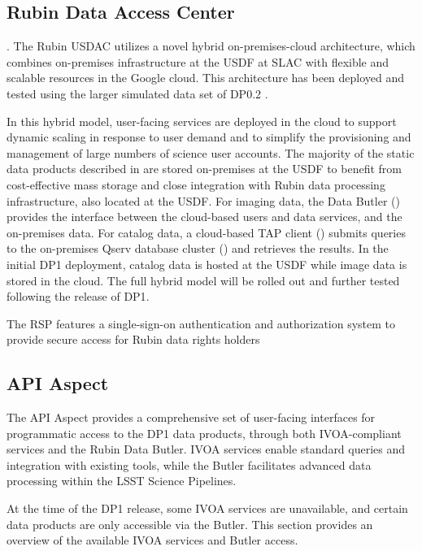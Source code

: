 \subsection{Rubin Data Access Center
\label{ssec:usdac}}.
The Rubin USDAC utilizes a novel hybrid on-premises-cloud architecture, which combines on-premises infrastructure at the \gls{USDF} at SLAC with flexible and scalable resources in the Google cloud. 
This architecture has been deployed and tested using the larger simulated data set of DP0.2 \citep{2024SPIE13101E..2BO}.

In this hybrid model, user-facing services are deployed in the cloud to support
dynamic scaling in response to user demand and to simplify the provisioning and management of large numbers of science user accounts.
The majority of the static data products described in  are stored on-premises at the \gls{USDF} to benefit from cost-effective mass storage and close integration with Rubin data processing infrastructure, also located at the \gls{USDF}.
For imaging data, the Data Butler () provides the interface between the cloud-based users and data services, and the on-premises data.
For catalog data, a cloud-based \gls{TAP} client () submits queries to the on-premises \gls{Qserv} database cluster () and retrieves the results.
In the initial DP1 deployment, catalog data is hosted at the USDF while image data is stored in the cloud. 
The full hybrid model will be rolled out and further tested following the release of \gls{DP1}.

The RSP features a single-sign-on authentication and authorization system to provide secure access for Rubin data rights holders \citep{rdo-013}

\subsection{API Aspect
\label{ssec:rsp_api}}
The API Aspect provides a comprehensive set of user-facing interfaces for programmatic access to the \gls{DP1} data products, through both IVOA-compliant services and the Rubin Data Butler. IVOA services enable standard queries and integration with existing tools, while the Butler facilitates advanced data processing within the LSST Science Pipelines.

At the time of the DP1 release, some IVOA services are unavailable, and certain data products are only accessible via the Butler. 
This section provides an overview of the available IVOA services and Butler access.

